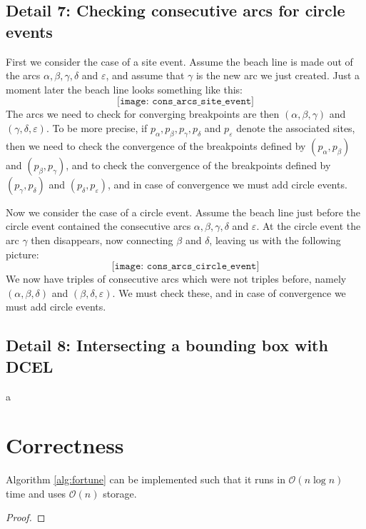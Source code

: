 \subsection*{Detail 7: Checking consecutive arcs for circle events}
First we consider the case of a site event. Assume the beach line is made out of the arcs $\alpha, \beta, \gamma, \delta$ and $\varepsilon$, and assume that $\gamma$ is the new arc we just created. Just a moment later the beach line looks something like this:
\[
    \texttt{[image: cons\_arcs\_site\_event]}
\]
The arcs we need to check for converging breakpoints are then $(\alpha, \beta, \gamma)$ and $(\gamma, \delta, \varepsilon)$. To be more precise, if $p_{\alpha}, p_{\beta}, p_{\gamma}, p_{\delta}$ and $p_{\varepsilon}$ denote the associated sites, then we need to check the convergence of the breakpoints defined by $(p_{\alpha}, p_{\beta})$ and $(p_{\beta}, p_{\gamma})$, and to check the convergence of the breakpoints defined by $(p_{\gamma}, p_{\delta})$ and $(p_{\delta}, p_{\varepsilon})$, and in case of convergence we must add circle events.

Now we consider the case of a circle event. Assume the beach line just before the circle event contained the consecutive arcs $\alpha, \beta, \gamma, \delta$ and $\varepsilon$. At the circle event the arc $\gamma$ then disappears, now connecting $\beta$ and $\delta$, leaving us with the following picture:
\[
    \texttt{[image: cons\_arcs\_circle\_event]}
\]
We now have triples of consecutive arcs which were not triples before, namely $(\alpha, \beta, \delta)$ and $(\beta, \delta, \varepsilon)$. We must check these, and in case of convergence we must add circle events.

\subsection*{Detail 8: Intersecting a bounding box with DCEL}
a

\section{Correctness}
\begin{lem}
Algorithm \ref{alg:fortune} can be implemented such that it runs in $\mathcal{O}(n \log n)$ time and uses $\mathcal{O}(n)$ storage.
\end{lem}
\begin{proof}
\end{proof}